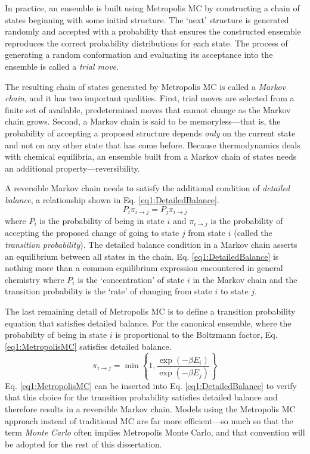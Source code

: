 In practice, an ensemble is built using Metropolis MC by constructing a chain of
states beginning with some initial structure. The `next' structure is generated
randomly and accepted with a probability that ensures the constructed ensemble
reproduces the correct probability distributions for each state. The process of
generating a random conformation and evaluating its acceptance into the ensemble
is called a \emph{trial move}.

The resulting chain of states generated by Metropolis MC is called a
\emph{Markov chain}, and it has two important qualities. First, trial moves are
selected from a finite set of available, predetermined moves that cannot change
as the Markov chain grows. Second, a Markov chain is said to be
memoryless---that is, the probability of accepting a proposed structure depends
\emph{only} on the current state and not on any other state that has come
before. Because thermodynamics deals with chemical equilibria, an ensemble built
from a Markov chain of states needs an additional property---reversibility.

A reversible Markov chain needs to satisfy the additional condition of
\emph{detailed balance}, a relationship shown in Eq. \ref{eq1:DetailedBalance}.
\begin{equation}
   P_i \pi_{i \rightarrow j} = P_j \pi_{i \rightarrow j}
   \label{eq1:DetailedBalance}
\end{equation}
where $P_i$ is the probability of being in state $i$ and $\pi_{i \rightarrow j}$
is the probability of accepting the proposed change of going to state $j$ from
state $i$ (called the \emph{transition probability}). The detailed balance
condition in a Markov chain asserts an equilibrium between all states in the
chain. Eq. \ref{eq1:DetailedBalance} is nothing more than a common equilibrium
expression encountered in general chemistry where $P_i$ is the `concentration'
of state $i$ in the Markov chain and the transition probability is the `rate' of
changing from state $i$ to state $j$.

The last remaining detail of Metropolis MC is to define a transition probability
equation that satisfies detailed balance. For the canonical ensemble, where the
probability of being in state $i$ is proportional to the Boltzmann factor, Eq.
\ref{eq1:MetropolisMC} satisfies detailed balance.
\begin{equation}
   \pi_{i \rightarrow j} = \min \left \lbrace 1, \frac {\exp ( -\beta E _ i )}
                         {\exp ( -\beta E _ j ) } \right \rbrace
   \label{eq1:MetropolisMC}
\end{equation}
Eq. \ref{eq1:MetropolisMC} can be inserted into Eq. \ref{eq1:DetailedBalance} to
verify that this choice for the transition probability satisfies detailed
balance and therefore results in a reversible Markov chain. Models using the
Metropolis MC approach instead of traditional MC are far more efficient---so
much so that the term \emph{Monte Carlo} often implies Metropolis Monte Carlo,
\cite{Tuckerman_Book_StatMech_TheoryAndSim,Leach_Book_MolModel_2001} and that
convention will be adopted for the rest of this dissertation.

